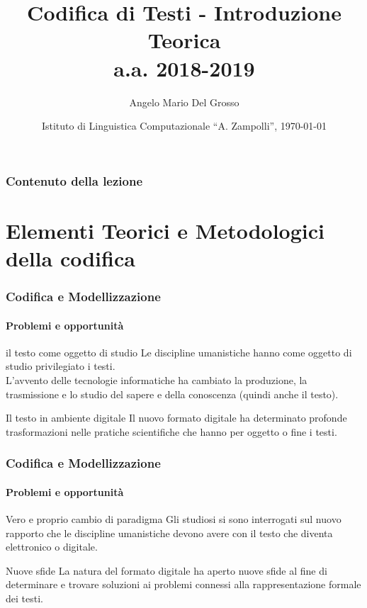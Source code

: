 \documentclass{beamer}
\title{Codifica di Testi - Introduzione Teorica \\a.a. 2018-2019}
\author[A.M. Del Grosso]{Angelo Mario Del Grosso}
\institute{\texttt{angelo.delgrosso@ilc.cnr.it} \\\bigskip\textit{CNR-ILC-LicoLab}}
\date{Istituto di Linguistica Computazionale ``A. Zampolli'', \today}
\begin{document}
\begin{frame}
	\maketitle
\end{frame}

\begin{frame}
	\frametitle{Contenuto della lezione}
	\tableofcontents
\end{frame}

\section{Elementi Teorici e Metodologici della codifica}
\begin{frame}
	\frametitle{Codifica e Modellizzazione}
	\framesubtitle{Problemi e opportunità}
	\addtocounter{nframe}{1}

	\begin{block}{il testo come oggetto di studio}
		Le discipline umanistiche hanno come oggetto di studio privilegiato i testi.
		\\ L'avvento delle tecnologie informatiche ha cambiato la produzione, la trasmissione e lo studio del sapere e della conoscenza (quindi anche il testo).
	\end{block}

	\begin{block}{Il testo in ambiente digitale}
		Il nuovo formato digitale ha determinato profonde trasformazioni nelle pratiche scientifiche che hanno per oggetto o fine i testi.
	\end{block}


\end{frame}

\begin{frame}
	\frametitle{Codifica e Modellizzazione}
	\framesubtitle{Problemi e opportunità}
	\addtocounter{nframe}{1}

	\begin{block}{Vero e proprio cambio di paradigma}
		Gli studiosi si sono interrogati sul nuovo rapporto che le discipline umanistiche devono avere con il testo che diventa elettronico o digitale.
	\end{block}

	\begin{block}{Nuove sfide}
		La natura del formato digitale ha aperto nuove sfide  al fine di determinare e trovare soluzioni ai problemi connessi alla rappresentazione formale dei testi.
	\end{block}


\end{frame}
\end{document}
